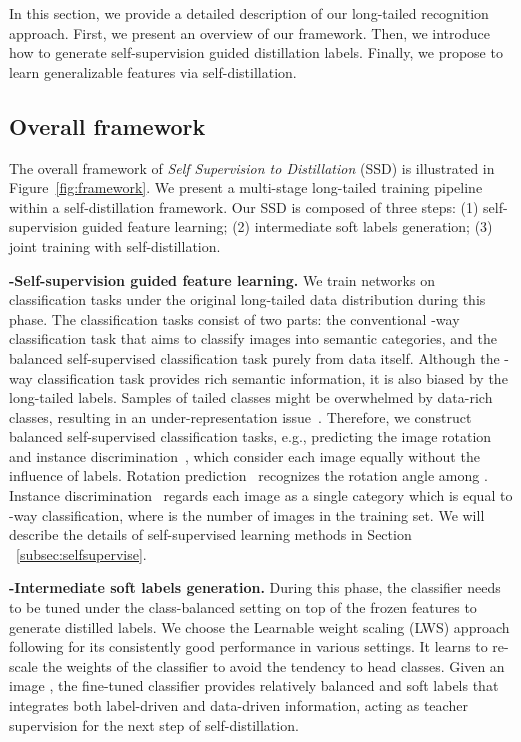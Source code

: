 \documentclass[10pt,twocolumn,letterpaper]{article}
\begin{document}
In this section, we provide a detailed description of our long-tailed recognition approach. First, we present an overview of our framework. Then, we introduce how to generate self-supervision guided distillation labels. Finally, we propose to learn generalizable features via self-distillation.

\subsection{Overall framework}
The overall framework of {\em Self Supervision to Distillation} (SSD) is illustrated in Figure~\ref{fig:framework}. We present a multi-stage long-tailed training pipeline within a self-distillation framework. Our SSD is composed of three steps: (1) self-supervision guided feature learning; (2) intermediate soft labels generation; (3) joint training with self-distillation.

\medskip
\noindent\textbf{\uppercase\expandafter{}-Self-supervision guided feature learning.} We train networks on classification tasks under the original long-tailed data distribution during this phase. The classification tasks consist of two parts: the conventional -way classification task that aims to classify images into  semantic categories, and the balanced self-supervised classification task purely from data itself. Although the -way classification task provides rich semantic information, it is also biased by the long-tailed labels. Samples of tailed classes might be  overwhelmed by data-rich classes, resulting in an under-representation issue~\cite{equalization, featureaugmentation}. Therefore, we construct balanced self-supervised classification tasks, e.g., predicting the image rotation~\cite{rotation} and instance discrimination~\cite{insdis, moco}, which consider each image equally without the influence of labels. Rotation prediction~\cite{rotation} recognizes the rotation angle among . Instance discrimination~\cite{insdis, moco} regards each image as a single category which is equal to -way classification, where  is the number of images in the training set. We will describe the details of self-supervised learning methods in Section ~\ref{subsec:selfsupervise}.

\medskip
\noindent\textbf{\uppercase\expandafter{}-Intermediate soft labels generation.} During this phase, the classifier needs to be tuned under the class-balanced setting on top of the frozen features to generate distilled labels. We choose the Learnable weight scaling (LWS) approach following \cite{decoupling} for its consistently good performance in various settings. It learns to re-scale the weights of the classifier to avoid the tendency to head classes. Given an image , the fine-tuned classifier provides relatively balanced and soft labels  that integrates both label-driven and data-driven information, acting as teacher supervision for the next step of self-distillation.
\end{document}
